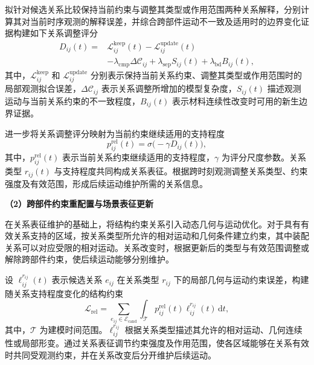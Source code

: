 拟针对候选关系比较保持当前约束与调整其类型或作用范围两种关系解释，分别计算其对当前时序观测的解释误差，并综合跨部件运动不一致及适用时的边界变化证据构建如下关系调整评分
\begin{equation}
  \begin{aligned}
  D_{ij}(t)
  ={}&
  \mathcal{L}_{ij}^{\mathrm{keep}}(t)
  -\mathcal{L}_{ij}^{\mathrm{update}}(t)\\
  &-\lambda_{\mathrm{cmp}}\Delta\mathcal{C}_{ij}
  +\lambda_{\mathrm{sep}}S_{ij}(t)
  +\lambda_{\mathrm{bd}}B_{ij}(t),
  \end{aligned}
  \label{eq:route-structure-relation-score}
\end{equation}
其中，$\mathcal{L}_{ij}^{\mathrm{keep}}$ 和 $\mathcal{L}_{ij}^{\mathrm{update}}$ 分别表示保持当前关系约束、调整其类型或作用范围时的局部观测拟合误差，$\Delta\mathcal{C}_{ij}$ 表示关系调整所增加的模型复杂度，$S_{ij}(t)$ 描述观测运动与当前关系约束的不一致程度，$B_{ij}(t)$ 表示材料连续性改变时可用的新生边界证据。

进一步将关系调整评分映射为当前约束继续适用的支持程度
\begin{equation}
  p_{ij}^{\mathrm{rel}}(t)
  =
  \sigma\bigl(-\gamma D_{ij}(t)\bigr),
  \label{eq:route-structure-relation-support}
\end{equation}
其中，$p_{ij}^{\mathrm{rel}}(t)$ 表示当前关系约束继续适用的支持程度，$\gamma$ 为评分尺度参数。关系类型 $r_{ij}(t)$ 与支持程度共同构成关系表征。根据跨时刻观测调整关系类型、约束强度及有效范围，形成后续运动维护所需的关系信息。

\noindent\textbf{（2）跨部件约束重配置与场景表征更新}

在关系表征维护的基础上，将结构约束关系引入动态几何与运动优化。对于具有有效关系支持的区域，按关系类型所允许的相对运动和几何条件建立约束，其中装配关系可以对应受限的相对运动。关系改变时，根据更新后的类型与有效范围调整或解除跨部件约束，使后续运动能够分别维护。

设 $\ell_{ij}^{r_{ij}}(t)$ 表示候选关系 $e_{ij}$ 在关系类型 $r_{ij}$ 下的局部几何与运动约束误差，构建随关系支持程度变化的结构约束
\begin{equation}
  \mathcal{L}_{\mathrm{rel}}
  =
  \sum_{e_{ij}\in\mathcal{E}_{\mathrm{cand}}}
  \int_{\mathcal{T}}
    p_{ij}^{\mathrm{rel}}(t)
    \ell_{ij}^{r_{ij}}(t)\,\mathrm{d}t,
  \label{eq:route-structure-relation-loss}
\end{equation}
其中，$\mathcal{T}$ 为建模时间范围。$\ell_{ij}^{r_{ij}}$ 根据关系类型描述其允许的相对运动、几何连续性或局部形变。通过关系表征调节约束强度及作用范围，使各区域能够在关系有效时共同受观测约束，并在关系改变后分开维护后续运动。

